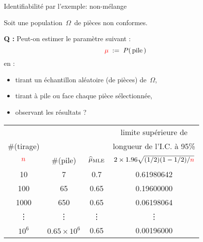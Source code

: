 
\begin{frame}{\vskip -0.2cm \Large Identifiabilit\'e par l'exemple: {\LARGE non-m\'elange}}

\mbox{}
\vskip -0.4cm

\pause
Soit une population \,$\Omega$\, de pi\`eces non conformes.

\pause
\vskip 0.3cm
\textbf{Q :}\; {\color{red}Peut-on estimer} le param\`etre suivant :
\begin{equation*}
{\color{red}\mu} \;:=\; P\!\left(\,\textnormal{pile}\,\right)
\end{equation*}
\vskip -0.3cm
en :
\pause
\begin{itemize}
\item
	tirant un \'echantillon al\'eatoire (de pi\`eces) de \,$\Omega$,
\item
	tirant \`a pile ou face chaque pi\`ece s\'electionn\'ee,
\item
	observant les r\'esultats ?
\end{itemize}

\scriptsize

\pause

\begin{center}
	\begin{tabular}{|c|c|c|c|}
	\hline
	& & & limite sup\'erieure de \\
	\#(tirage) & & & longueur de l'I.C. \`a 95\% \\
	${\color{red}n}$ & \multirow{-3}{*}{\#(pile)} & \multirow{-3}{*}{$\widehat{\mu}_{\textnormal{MLE}}$} & $2 \times 1.96\sqrt{(1/2)(1-1/2)/{\color{red}n}}$ \\
	\hline
	\hline
	10 & 7 & 0.7 & 0.61980642 \\
	100 & 65 & 0.65 & 0.19600000\\
	1000 & 650 & 0.65 & 0.06198064 \\
	\vdots & \vdots & \vdots & \vdots \\
	$10^{6}$ & $0.65 \times 10^{6}$ & 0.65 &  0.00196000 \\
	\hline
	\end{tabular}
\end{center}

\end{frame}
\normalsize

